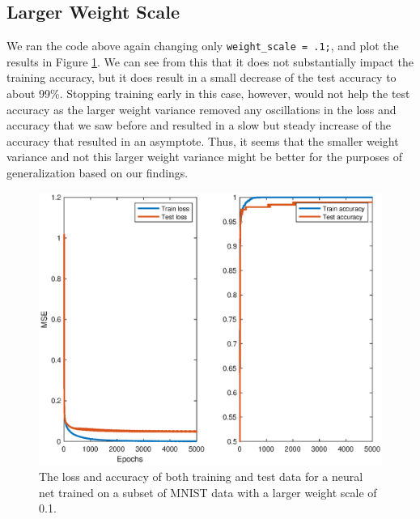 \documentclass[11pt, oneside]{article}
\begin{document}
\subsection{Larger Weight Scale}

We ran the code above again changing only \lstinline{weight_scale = .1;}, and plot the results in Figure \ref{fig:netMetrics2}. We can see from this that it does not substantially impact the training accuracy, but it does result in a small decrease of the test accuracy to about 99\%. Stopping training early in this case, however, would not help the test accuracy as the larger weight variance removed any oscillations in the loss and accuracy that we saw before and resulted in a slow but steady increase of the accuracy that resulted in an asymptote. Thus, it seems that the smaller weight variance and not this larger weight variance might be better for the purposes of generalization based on our findings. 

\begin{figure}[ht!]
\includegraphics[width=1\textwidth]{netMetrics2.eps}
\caption{The loss and accuracy of both training and test data for a neural net trained on a subset of MNIST data with a larger weight scale of 0.1.}
\label{fig:netMetrics2}
\end{figure}
\end{document}
